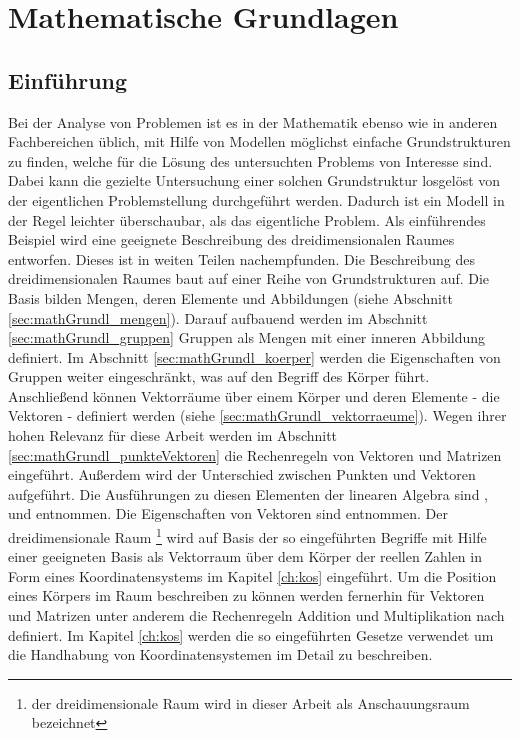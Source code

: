 \chapter{Mathematische Grundlagen}\label{ch:mathGrundl}
\section{Einf\"uhrung}\label{sec:mathGrundl_einfuehrung}
    Bei der Analyse von Problemen ist es in der Mathematik  ebenso wie in anderen Fachbereichen \"ublich, mit Hilfe von Modellen m\"oglichst einfache Grundstrukturen zu finden, welche f\"ur die L\"osung des untersuchten Problems von Interesse sind. Dabei kann die gezielte Untersuchung einer solchen Grundstruktur losgel\"ost von der eigentlichen Problemstellung durchgef\"uhrt werden. Dadurch ist ein Modell in der Regel leichter \"uberschaubar, als das eigentliche Problem. \newline
    Als einf\"uhrendes Beispiel wird eine geeignete Beschreibung des dreidimensionalen Raumes entworfen. Dieses ist in weiten Teilen \cite{Bosch2014} nachempfunden. \newline
    Die Beschreibung des dreidimensionalen Raumes baut auf einer Reihe von Grundstrukturen auf. Die Basis bilden Mengen, deren Elemente und Abbildungen (siehe Abschnitt \ref{sec:mathGrundl_mengen}). Darauf aufbauend werden im Abschnitt \ref{sec:mathGrundl_gruppen} Gruppen als Mengen mit einer inneren Abbildung  definiert. Im Abschnitt \ref{sec:mathGrundl_koerper} werden die Eigenschaften von Gruppen weiter eingeschr\"ankt, was auf den Begriff des K\"orper f\"uhrt. Anschlie\ss{}end k\"onnen Vektorr\"aume \"uber einem K\"orper und deren Elemente - die Vektoren - definiert werden (siehe \ref{sec:mathGrundl_vektorraeume}). Wegen ihrer hohen Relevanz f\"ur diese Arbeit werden im Abschnitt \ref{sec:mathGrundl_punkteVektoren} die Rechenregeln von Vektoren und Matrizen eingef\"uhrt. Au\ss{}erdem wird der Unterschied zwischen Punkten und Vektoren aufgef\"uhrt. Die Ausf\"uhrungen zu diesen Elementen der linearen Algebra sind \cite{Bosch2014}, \cite{MatthiasPlaue2009} und \cite{Modler2011d} entnommen. Die Eigenschaften von Vektoren sind \cite{Papula2014} entnommen. \newline
    Der dreidimensionale Raum \footnote{der dreidimensionale Raum wird in dieser Arbeit als Anschauungsraum bezeichnet} wird auf Basis der so eingef\"uhrten Begriffe mit Hilfe einer geeigneten Basis als Vektorraum \"uber dem K\"orper der reellen Zahlen in Form eines Koordinatensystems im Kapitel \ref{ch:kos} eingef\"uhrt.   \newline
    Um die Position eines K\"orpers im Raum beschreiben zu k\"onnen werden fernerhin f\"ur Vektoren und Matrizen unter anderem die Rechenregeln Addition und Multiplikation nach \cite{Papula2014} definiert. Im Kapitel \ref{ch:kos} werden die so eingef\"uhrten Gesetze verwendet um die Handhabung von Koordinatensystemen im Detail zu beschreiben. \newline
    
